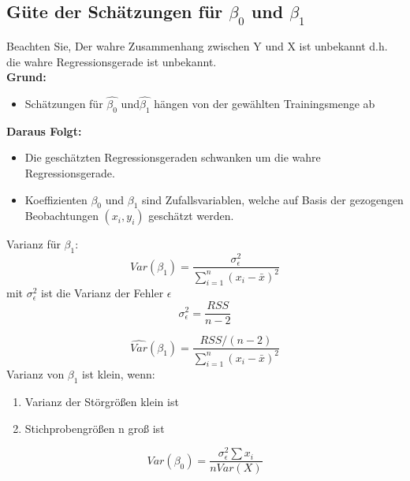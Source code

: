\documentclass[../VorlesungMaster.tex]{subfiles}
\begin{document}
	
\subsection{Güte der Schätzungen für $\beta_0$ und $\beta_1$}
Beachten Sie, Der wahre Zusammenhang zwischen Y und X ist unbekannt d.h. die wahre Regressionsgerade ist unbekannt. \\
\textbf{Grund:} 
\begin{itemize}
	\item Schätzungen für $\hat{\beta_0}$ und$ \hat{\beta_1}$ hängen von der gewählten Trainingsmenge ab\\
\end{itemize}
\textbf{Daraus Folgt:} 
\begin{itemize}
	\item Die geschätzten Regressionsgeraden schwanken um die wahre Regressionsgerade.
	\item Koeffizienten $\beta_0$ und $\beta_1$ sind Zufallsvariablen, welche auf Basis der gezogengen Beobachtungen $(x_i,y_i)$ geschätzt werden.
\end{itemize}






Varianz für $\beta_1$:
\[ 
	Var(\beta_1)= \frac{\sigma_{\epsilon}^2}{\sum\limits_{i=1}^n (x_i-\bar{x})^2} 
\]
mit $\sigma_{\epsilon}^2$ ist die Varianz der Fehler $\epsilon$
\[\sigma_{\epsilon}^2 = \frac{RSS}{n-2} \]

\[\hat{Var}(\beta_1)=\frac{RSS/(n-2)}{\sum\limits_{i=1}^n (x_i-\bar{x})^2} \]
Varianz von $\beta_1$ ist klein, wenn:
\begin{enumerate}
	\item Varianz der Störgrößen klein ist
	\item Stichprobengrößen n groß ist
\end{enumerate}
\[Var(\beta_0) = \frac{\sigma_\epsilon^2  \sum x_i}{n Var(X)}\]
\end{document}
